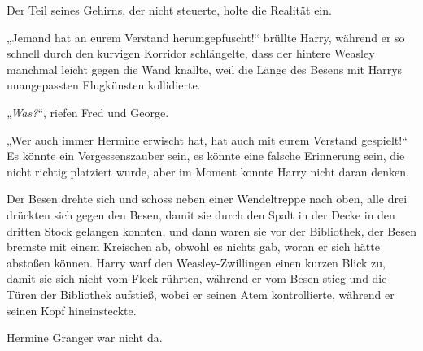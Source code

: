 Der Teil seines Gehirns, der nicht steuerte, holte die Realität ein.

„Jemand hat an eurem Verstand herumgepfuscht!“ brüllte Harry, während er so schnell durch den kurvigen Korridor schlängelte, dass der hintere Weasley manchmal leicht gegen die Wand knallte, weil die Länge des Besens mit Harrys unangepassten Flugkünsten kollidierte.

\emph{„Was?}“, riefen Fred und George.

„Wer auch immer Hermine erwischt hat, hat auch mit eurem Verstand gespielt!“ Es könnte ein Vergessenszauber sein, es könnte eine falsche Erinnerung sein, die nicht richtig platziert wurde, aber im Moment konnte Harry nicht daran denken.

Der Besen drehte sich und schoss neben einer Wendeltreppe nach oben, alle drei drückten sich gegen den Besen, damit sie durch den Spalt in der Decke in den dritten Stock gelangen konnten, und dann waren sie vor der Bibliothek, der Besen bremste mit einem Kreischen ab, obwohl es nichts gab, woran er sich hätte abstoßen können. Harry warf den Weasley-Zwillingen einen kurzen Blick zu, damit sie sich nicht vom Fleck rührten, während er vom Besen stieg und die Türen der Bibliothek aufstieß, wobei er seinen Atem kontrollierte, während er seinen Kopf hineinsteckte.

Hermine Granger war nicht da.


